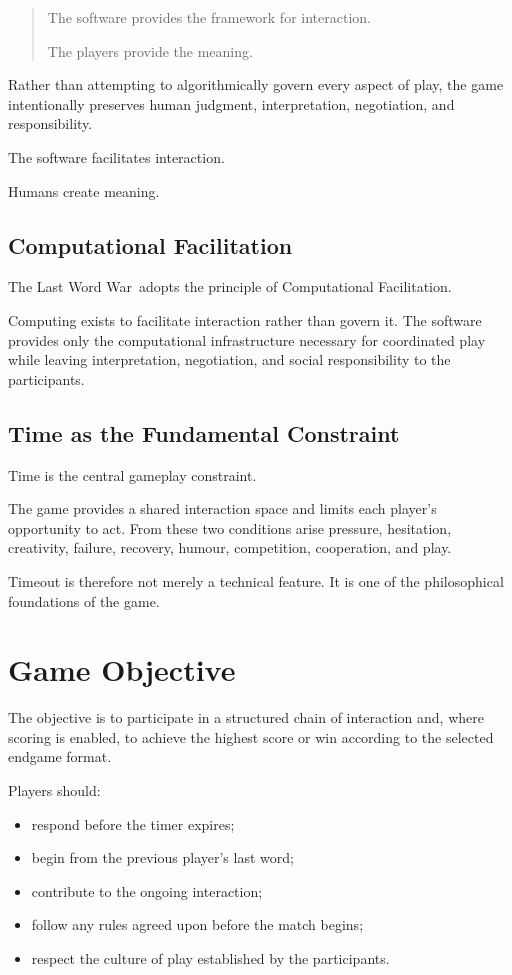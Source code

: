\documentclass[11pt,a4paper]{article}
\begin{document}
\begin{quote}
The software provides the framework for interaction.

The players provide the meaning.
\end{quote}

Rather than attempting to algorithmically govern every aspect of play, the game intentionally preserves human judgment, interpretation, negotiation, and responsibility.

The software facilitates interaction.

Humans create meaning.

\subsection{Computational Facilitation}

The Last Word War\texttrademark\ adopts the principle of Computational Facilitation.

Computing exists to facilitate interaction rather than govern it. The software provides only the computational infrastructure necessary for coordinated play while leaving interpretation, negotiation, and social responsibility to the participants.

\subsection{Time as the Fundamental Constraint}

Time is the central gameplay constraint.

The game provides a shared interaction space and limits each player's opportunity to act. From these two conditions arise pressure, hesitation, creativity, failure, recovery, humour, competition, cooperation, and play.

Timeout is therefore not merely a technical feature. It is one of the philosophical foundations of the game.

\section{Game Objective}

The objective is to participate in a structured chain of interaction and, where scoring is enabled, to achieve the highest score or win according to the selected endgame format.

Players should:

\begin{itemize}
    \item respond before the timer expires;
    \item begin from the previous player's last word;
    \item contribute to the ongoing interaction;
    \item follow any rules agreed upon before the match begins;
    \item respect the culture of play established by the participants.
\end{itemize}
\end{document}

